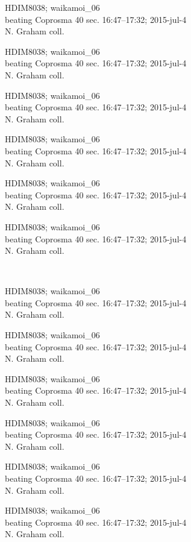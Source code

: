 \documentclass[2pt]{extarticle}
\begin{document}
\noindent
\parbox{0.16\textwidth}{\tiny \raggedright \rule[-0.3\baselineskip]{0pt}{10pt}HDIM8038; waikamoi\_06\\ beating Coprosma 40 sec. 16:47--17:32; 2015-jul-4\\ N. Graham coll.}
\parbox{0.16\textwidth}{\tiny \raggedright \rule[-0.3\baselineskip]{0pt}{10pt}HDIM8038; waikamoi\_06\\ beating Coprosma 40 sec. 16:47--17:32; 2015-jul-4\\ N. Graham coll.}
\parbox{0.16\textwidth}{\tiny \raggedright \rule[-0.3\baselineskip]{0pt}{10pt}HDIM8038; waikamoi\_06\\ beating Coprosma 40 sec. 16:47--17:32; 2015-jul-4\\ N. Graham coll.}
\parbox{0.16\textwidth}{\tiny \raggedright \rule[-0.3\baselineskip]{0pt}{10pt}HDIM8038; waikamoi\_06\\ beating Coprosma 40 sec. 16:47--17:32; 2015-jul-4\\ N. Graham coll.}
\parbox{0.16\textwidth}{\tiny \raggedright \rule[-0.3\baselineskip]{0pt}{10pt}HDIM8038; waikamoi\_06\\ beating Coprosma 40 sec. 16:47--17:32; 2015-jul-4\\ N. Graham coll.}
\parbox{0.16\textwidth}{\tiny \raggedright \rule[-0.3\baselineskip]{0pt}{10pt}HDIM8038; waikamoi\_06\\ beating Coprosma 40 sec. 16:47--17:32; 2015-jul-4\\ N. Graham coll.} \\ 
\vspace{0.001in} 

\noindent
\parbox{0.16\textwidth}{\tiny \raggedright \rule[-0.3\baselineskip]{0pt}{10pt}HDIM8038; waikamoi\_06\\ beating Coprosma 40 sec. 16:47--17:32; 2015-jul-4\\ N. Graham coll.}
\parbox{0.16\textwidth}{\tiny \raggedright \rule[-0.3\baselineskip]{0pt}{10pt}HDIM8038; waikamoi\_06\\ beating Coprosma 40 sec. 16:47--17:32; 2015-jul-4\\ N. Graham coll.}
\parbox{0.16\textwidth}{\tiny \raggedright \rule[-0.3\baselineskip]{0pt}{10pt}HDIM8038; waikamoi\_06\\ beating Coprosma 40 sec. 16:47--17:32; 2015-jul-4\\ N. Graham coll.}
\parbox{0.16\textwidth}{\tiny \raggedright \rule[-0.3\baselineskip]{0pt}{10pt}HDIM8038; waikamoi\_06\\ beating Coprosma 40 sec. 16:47--17:32; 2015-jul-4\\ N. Graham coll.}
\parbox{0.16\textwidth}{\tiny \raggedright \rule[-0.3\baselineskip]{0pt}{10pt}HDIM8038; waikamoi\_06\\ beating Coprosma 40 sec. 16:47--17:32; 2015-jul-4\\ N. Graham coll.}
\parbox{0.16\textwidth}{\tiny \raggedright \rule[-0.3\baselineskip]{0pt}{10pt}HDIM8038; waikamoi\_06\\ beating Coprosma 40 sec. 16:47--17:32; 2015-jul-4\\ N. Graham coll.} \\ 
\vspace{0.001in} 
\end{document}
